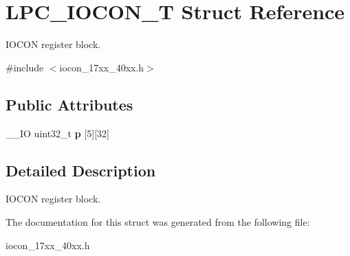 \hypertarget{struct_l_p_c___i_o_c_o_n___t}{\section{L\+P\+C\+\_\+\+I\+O\+C\+O\+N\+\_\+\+T Struct Reference}
\label{struct_l_p_c___i_o_c_o_n___t}
}


I\+O\+C\+O\+N register block.  




{\ttfamily \#include $<$iocon\+\_\+17xx\+\_\+40xx.\+h$>$}

\subsection*{Public Attributes}
\begin{DoxyCompactItemize}
\item 
\hypertarget{struct_l_p_c___i_o_c_o_n___t_aea0d3512ec47df7ef7573774e36349c8}{\+\_\+\+\_\+\+I\+O uint32\+\_\+t {\bfseries p} \mbox{[}5\mbox{]}\mbox{[}32\mbox{]}}\label{struct_l_p_c___i_o_c_o_n___t_aea0d3512ec47df7ef7573774e36349c8}

\end{DoxyCompactItemize}


\subsection{Detailed Description}
I\+O\+C\+O\+N register block. 

The documentation for this struct was generated from the following file\+:\begin{DoxyCompactItemize}
\item 
iocon\+\_\+17xx\+\_\+40xx.\+h\end{DoxyCompactItemize}
